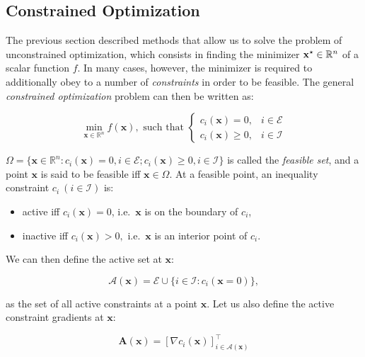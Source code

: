 \subsection{Constrained Optimization}

The previous section described methods that allow us to solve the
problem of unconstrained optimization, which consists in finding the
minimizer $\mathbf{x}^{\star}\in\mathbb R^n$ of a scalar function $f$. In many
cases, however, the minimizer is required to additionally obey to a
number of \emph{constraints} in order to be feasible. The general
\emph{constrained optimization} problem can then be written as:

\begin{equation}
\label{eq:chap3-nlp}
\min_{\mathbf{x} \in \mathbb R^n}
f(\mathbf{x}),\text{ such that }
\left\{\begin{array}{cc}
c_i(\mathbf{x}) = 0, & i \in \mathcal{E} \\%
c_i(\mathbf{x}) \ge 0, & i \in \mathcal{I} %
\end{array}\right.
\end{equation}

$\Omega=\{\mathbf{x}\in\mathbb R^n: c_i(\mathbf{x}) = 0, i \in
\mathcal{E}; c_i(\mathbf{x}) \ge 0, i \in \mathcal{I}\}$ is called the
\emph{feasible set}, and a point $\mathbf{x}$ is said to be feasible
iff $\mathbf{x}\in\Omega$. At a feasible point, an inequality
constraint $c_i~(i\in \mathcal{I})$ is:

\begin{itemize}[noitemsep,nolistsep]
\item active iff $c_i(\mathbf{x})=0$, i.e.\ $\mathbf{x}$ is on the boundary of $c_i$,
\item inactive iff $c_i(\mathbf{x})>0,$ i.e.\ $\mathbf{x}$ is an
  interior point of $c_i$.
\end{itemize}
\vspace{\baselineskip}
We can then define the active set at $\mathbf{x}$:

\begin{equation}
\mathcal{A}(\mathbf{x})=\mathcal{E}\cup\{i\in\mathcal{I}:c_i(\mathbf{x}=0)\},
\end{equation}

\noindent as the set of all active constraints at a point $\mathbf{x}$. Let us
also define the active constraint gradients at $\mathbf{x}$:

\begin{equation}
\mathbf{A}(\mathbf{x})=\left[\nabla
  c_i(\mathbf{x})\right]_{i\in\mathcal{A}(\mathbf{x})}^\top
\end{equation}

